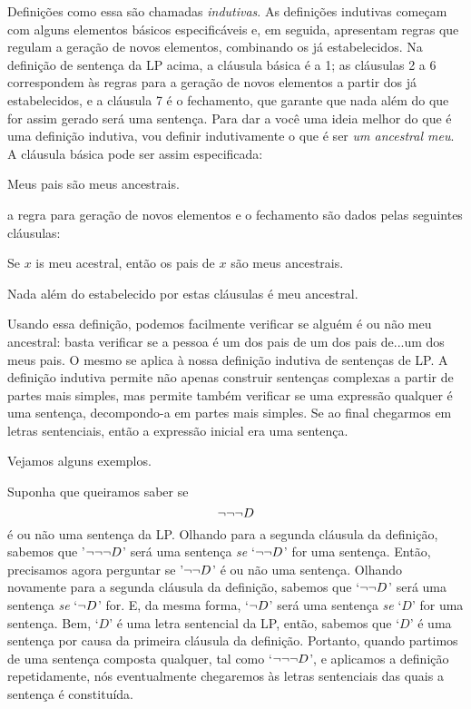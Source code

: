 Definições como essa são chamadas \emph{indutivas}.
As definições indutivas começam com alguns elementos básicos especificáveis e, em seguida, apresentam regras que regulam a geração de novos elementos, combinando os já estabelecidos.
Na definição de sentença da LP acima, a cláusula básica é a 1; as cláusulas 2 a 6 correspondem às regras para a geração de novos elementos a partir dos já estabelecidos, e a cláusula 7 é o fechamento, que garante que nada além do que for assim gerado será uma sentença.
Para dar a você uma ideia melhor do que é uma definição indutiva, vou definir indutivamente o que é ser \emph{um ancestral meu}.
A cláusula básica pode ser assim especificada:
	\begin{ebullet}
		\item Meus pais são meus ancestrais.
	\end{ebullet}
a regra para geração de novos elementos e o fechamento são dados pelas seguintes cláusulas:
	\begin{ebullet}
		\item Se $x$ is meu acestral, então os pais de $x$ são meus ancestrais.
		\item Nada além do estabelecido por estas cláusulas é meu ancestral.
	\end{ebullet}
Usando essa definição, podemos facilmente verificar se alguém é ou não meu ancestral:
basta verificar se a pessoa é um dos pais de um dos pais de...um dos meus pais.
O mesmo se aplica à nossa definição indutiva de sentenças de LP.
A definição indutiva permite não apenas construir sentenças complexas a partir de partes mais simples, mas permite também verificar se uma expressão qualquer é uma sentença, decompondo-a em partes mais simples. Se ao final chegarmos em letras sentenciais, então a expressão inicial era uma sentença.

Vejamos alguns exemplos.

Suponha que queiramos saber se
$$\neg\neg\neg D$$
é ou não uma sentença da LP.
Olhando para a segunda cláusula da definição, sabemos que '$\neg\neg\neg D$' será uma sentença \emph{se} `$\neg\neg D$' for uma sentença.
Então, precisamos agora perguntar se '$\neg\neg D$' é ou não uma sentença.
Olhando novamente para a segunda cláusula da definição, sabemos que `$\neg\neg D$' será uma sentença \emph{se} `$\neg D$' for.
E, da mesma forma, `$\neg D$' será uma sentença \emph{se} `$D$' for uma sentença.
Bem, `$D$' é uma letra sentencial da LP, então, sabemos que `$D$' é uma sentença por causa da primeira cláusula da definição.
Portanto, quando partimos de uma sentença composta qualquer, tal como `$\neg\neg\neg D$', e aplicamos a definição repetidamente, nós eventualmente chegaremos às letras sentenciais das quais a sentença é constituída.


